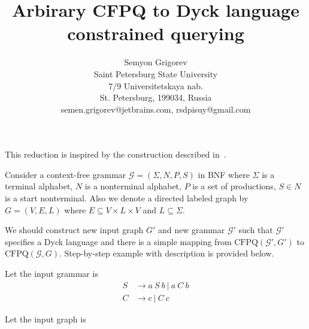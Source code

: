 \documentclass[12pt]{article}  %
\title{Arbirary CFPQ to Dyck language constrained querying}
\author{Semyon Grigorev
\\
       {Saint Petersburg State University}\\
       {7/9 Universitetskaya nab.}\\
       {St. Petersburg, 199034, Russia}\\
       semen.grigorev@jetbrains.com, rsdpisuy@gmail.com
       }
\date{}
\theoremstyle{definition}
\theoremstyle{remark}
\begin{document}

\maketitle

This reduction is inspired by the construction described in~\cite{OptimalDLR}.

Consider a context-free grammar $\mathcal{G}=(\Sigma, N, P, S)$ in BNF where $\Sigma$ is a terminal alphabet, $N$ is 
a nonterminal alphabet, $P$ is a set of productions, $S \in N$ is a start nonterminal.
Also we denote a directed labeled graph by $G=(V,E,L)$ where $E \subseteq V \times L \times V$ and $L \subseteq \Sigma$. 

We should construct new input graph $G'$ and new grammar $\mathcal{G'}$ such that $\mathcal{G'}$ specifies a Dyck language and there is a simple mapping from $\text{CFPQ}(\mathcal{G'}, G')$ to $\text{CFPQ}(\mathcal{G}, G)$.
Step-by-step example with description is provided below.
 
Let the input grammar is 
\begin{align*}
S & \rightarrow a \ S \ b \ | \ a \ C \ b 
\\
C & \rightarrow c \ | \ C \ c
\end{align*}

Let the input graph is
\\
\end{document}
